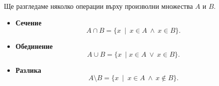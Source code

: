 Ще разгледаме няколко операции върху произволни множества $A$ и $B$.
\begin{itemize}
\item
  {\bf Сечение}
  \[A\cap B = \{x\ \mid\ x\in A\ \wedge\ x\in B\}.\]
  \item
    {\bf Обединение}
    \[A\cup B = \{x\ \mid x\in A\ \vee\ x\in B\}.\]
  \item
    {\bf Разлика}
    \[A\setminus B = \{x\ \mid\ x\in A\ \wedge\ x\not\in B\}.\]

\end{itemize}

